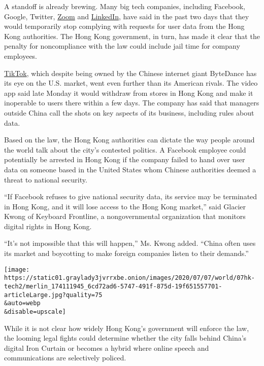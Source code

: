 A standoff is already brewing. Many big tech companies, including
Facebook, Google, Twitter,
\href{https://hongkongfp.com/2020/07/07/breaking-zoom-suspends-data-requests-from-hong-kong-govt-over-national-security-law-concerns/}{Zoom}
and
\href{https://qz.com/1877636/chinas-great-firewall-arrives-in-hong-kongs-internet/}{LinkedIn},
have said in the past two days that they would temporarily stop
complying with requests for user data from the Hong Kong authorities.
The Hong Kong government, in turn, has made it clear that the penalty
for noncompliance with the law could include jail time for company
employees.

\href{https://www.nytimes3xbfgragh.onion/2020/07/06/technology/tiktok-google-facebook-twitter-hong-kong.html}{TikTok},
which despite being owned by the Chinese internet giant ByteDance has
its eye on the U.S. market, went even further than its American rivals.
The video app said late Monday it would withdraw from stores in Hong
Kong and make it inoperable to users there within a few days. The
company has said that managers outside China call the shots on key
aspects of its business, including rules about data.

Based on the law, the Hong Kong authorities can dictate the way people
around the world talk about the city's contested politics. A Facebook
employee could potentially be arrested in Hong Kong if the company
failed to hand over user data on someone based in the United States whom
Chinese authorities deemed a threat to national security.

``If Facebook refuses to give national security data, its service may be
terminated in Hong Kong, and it will lose access to the Hong Kong
market,'' said Glacier Kwong of Keyboard Frontline, a nongovernmental
organization that monitors digital rights in Hong Kong.

``It's not impossible that this will happen,'' Ms. Kwong added. ``China
often uses its market and boycotting to make foreign companies listen to
their demands.''

\texttt{[image: https://static01.graylady3jvrrxbe.onion/images/2020/07/07/world/07hk-tech2/merlin\_174111945\_6cd72ad6-5747-491f-875d-19f651557701-articleLarge.jpg?quality=75\\\&auto=webp\\\&disable=upscale]}

While it is not clear how widely Hong Kong's government will enforce the
law, the looming legal fights could determine whether the city falls
behind China's digital Iron Curtain or becomes a hybrid where online
speech and communications are selectively policed.

